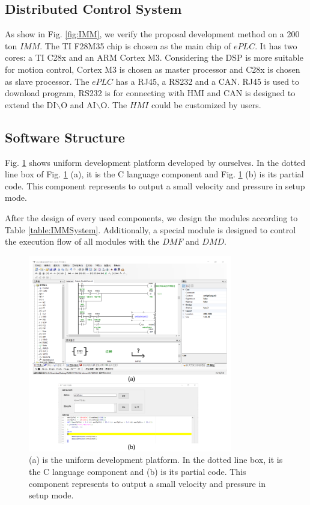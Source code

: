 \documentclass[journal,UTF8]{IEEEtran}
\begin{document}
\subsection{Distributed Control System}
As show in Fig. \ref{fig:IMM}, we verify the proposal development method on a 200 ton $IMM$. The TI F28M35 chip is chosen as the main chip of $ePLC$. It has two cores: a TI C28x and an ARM Cortex M3. Considering the DSP is more suitable for motion control, Cortex M3 is chosen as master processor and C28x is chosen as slave processor. The $ePLC$ has a RJ45, a RS232 and a CAN. RJ45 is used to download program, RS232 is for connecting with HMI and CAN is designed to extend the DI$\backslash$O and AI$\backslash$O. The $HMI$ could be customized by users.

\subsection{Software Structure}
Fig. \ref{fig:ld} shows uniform development platform developed by ourselves. In the dotted line box of Fig. \ref{fig:ld} (a), it is the C language component and Fig. \ref{fig:ld} (b) is its partial code. This component represents to output a small velocity and pressure in setup mode.

After the design of every used components, we design the modules according to Table \ref{table:IMMSystem}. Additionally, a special module is designed to control the execution flow of all modules with the $DMF$ and $DMD$.

\begin{figure}
	\centering
	\includegraphics[width=3.5in]{fig/ld.pdf}
	\caption{(a) is the uniform development platform. In the dotted line box, it is the C language component and (b) is its partial code. This component represents to output a small velocity and pressure in setup mode.}
	\label{fig:ld}
\end{figure}
\end{document}
